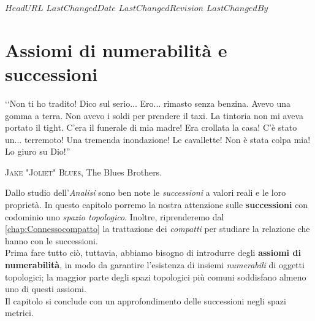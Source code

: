 \svnidlong
{$HeadURL$}
{$LastChangedDate$}
{$LastChangedRevision$}
{$LastChangedBy$}

\chapter{Assiomi di numerabilità e successioni}

\begin{introduction}
‘‘Non ti ho tradito! Dico sul serio... Ero... rimasto senza benzina. Avevo una gomma a terra. Non avevo i soldi per prendere il taxi. La tintoria non mi aveva portato il tight. C'era il funerale di mia madre! Era crollata la casa! C'è stato un... terremoto! Una tremenda inondazione! Le cavallette! Non è stata colpa mia! Lo giuro su Dio!''
\begin{flushright}
	\textsc{Jake "Joliet" Blues,} The Blues Brothers.
\end{flushright}
\end{introduction}
\noindent Dallo studio dell'\textit{Analisi} sono ben note le \textit{successioni} a valori reali e le loro proprietà. In questo capitolo porremo la nostra attenzione sulle \textbf{successioni} con codominio uno \textit{spazio topologico}. Inoltre, riprenderemo dal \autoref{chap:Connessocompatto} la trattazione dei \textit{compatti} per studiare la relazione che hanno con le successioni.\\
Prima fare tutto ciò, tuttavia, abbiamo bisogno di introdurre degli \textbf{assiomi di numerabilità}, in modo da garantire l'esistenza di insiemi \textit{numerabili} di oggetti topologici; la maggior parte degli spazi topologici più comuni soddisfano almeno uno di questi assiomi.\\
Il capitolo si conclude con un approfondimento delle successioni negli spazi metrici.
